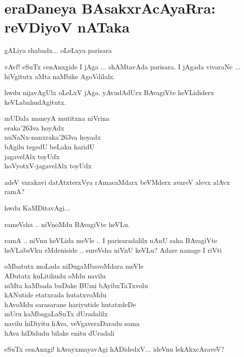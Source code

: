 \chapter[eraDaneya BAsakxrAcAyaRra : reVDiyoV nATaka]{eraDaneya BAsakxrAcAyaRra\break : reVDiyoV nATaka}

\qquad gALiya shabadx$\ldots$ oLeLxya parisara
\begin{description}
  \itemsep=1pt
\item[rameVsha:] vAvf! eSuTx cenAnxgide I jAga $\ldots$ shAMtavAda parisara. I jAgada vivaraNe $\ldots$ hiVgitutx aMta naMbike AgoVdilalx.

\item[sureVsha:] hwdu nijavAgUlx oLeLxV jAga. yAvudAdUrx BAvagiVte heVLididerx keVLabahudAgitutx.

\item[rameVsha:] mUDala maneyA mutitxna niVrina\\
eraka\char'263va hoyAdx\\
nuNaNx-nanxraka\char'263va hoyadx\\
bAgilu tegedU beLaku haridU\\
jagavelAlx toyUdx\\
hoVyotxV-jagavelAlx toyUdx

\item[rameVsha:] adeV varakavi datAtxterxVya rAmacaMdarx beVMderx avareV alevx alAvx ramA?

\item[ramA:] hwdu KaMDitavAgi$\ldots$

rameVsha .. niVnoMdu BAvagiVte heVLu.

\item[rameVsha:] ramA .. niVnu heVLida meVle .. I parisaradalilx nAnU saha BAvagiVte heVLabeVku eMdeniside .. sureVsha niVnU keVLu? Adare nanage I riVti 

\smallskip
oMbatutx moLada niDugaMbavoMdara meVle\\
ADutatx kuLitihudu oMdu navilu\\
niMta kaMbada buDake BUmi bAyibxTaTxvolu\\
kANutide etatxrada hutatxvoMdu\\
hAvoMdu sarasarane hariyutide hutatxdeDe\\
mUru kaMbagaLaSuTx dUradalilx\\
navilu hiDiyitu hAva, veVgaveraDaradu sama\\
hAva hiDidudu bilake enitu dUradali
\smallskip

\item[ramA:] eSuTx cenAnxgi! kAvayxmayavAgi hADidedxV... ideVnu lekAkxcAraveV?


\end{description}
